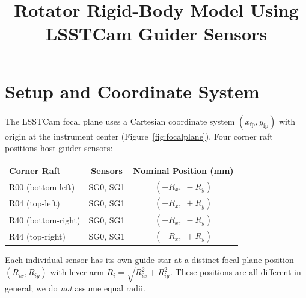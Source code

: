 \documentclass[SE,lsstdraft,authoryear,toc]{lsstdoc}
\title{Rotator Rigid-Body Model Using LSSTCam Guider Sensors}
\date{\vcsDate}
\newcommand{\Rix}{R_{ix}}
\newcommand{\Riy}{R_{iy}}
\begin{document}
\maketitle

\section{Setup and Coordinate System}
\label{sec:setup}

The LSSTCam focal plane uses a Cartesian coordinate system
$(x_\mathrm{fp}, y_\mathrm{fp})$ with origin at the instrument center
(Figure~\ref{fig:focalplane}).  Four corner raft positions host guider
sensors:

\begin{center}
\begin{tabular}{lcc}
\toprule
Corner Raft & Sensors & Nominal Position (mm) \\
\midrule
R00 (bottom-left)  & SG0, SG1 & $(-R_x,\;-R_y)$ \\
R04 (top-left)     & SG0, SG1 & $(-R_x,\;+R_y)$ \\
R40 (bottom-right) & SG0, SG1 & $(+R_x,\;-R_y)$ \\
R44 (top-right)    & SG0, SG1 & $(+R_x,\;+R_y)$ \\
\bottomrule
\end{tabular}
\end{center}

\noindent
Each individual sensor has its own guide star at a distinct focal-plane
position $(\Rix, \Riy)$ with lever arm
$R_i = \sqrt{\Rix^2 + \Riy^2}$.  These positions are all different in
general; we do \emph{not} assume equal radii.
\end{document}
